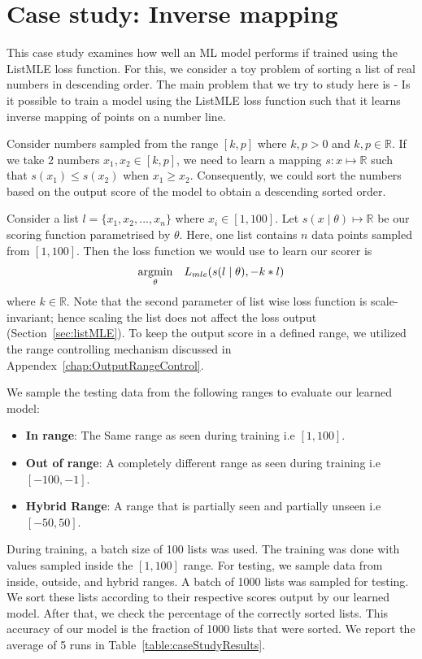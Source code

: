 \documentclass[12pt, twoside, ngerman]{report}
\begin{document}
\chapter{Case study: Inverse mapping}
\label{chap:caseStudy}

This case study examines how well an ML model performs if trained using the ListMLE loss function. For this, we consider a toy problem of sorting a list of real numbers in descending order. The main problem that we try to study here is - Is it possible to train a model using the ListMLE loss function such that it learns inverse mapping of points on a number line.

Consider numbers sampled from the range $[k,  p]$ where $k,p > 0$ and  $k,p \in \mathbb{R}$.
If we take 2 numbers $x_1, x_2 \in [k,  p]$,  we need to learn a mapping $s: x \mapsto \mathbb{R}$ such that $s(x_1) \leq s(x_2)$ when $x_1 \geq x_2$.
Consequently, we could sort the numbers based on the output score of the model to obtain a descending sorted order.

Consider a list $l = \{x_1, x_2, ..., x_n\}$ where $x_i \in [1, 100]$.
Let $s(x \mid \theta) \mapsto \mathbb{R}$ be our scoring function parametrised by $\theta$.
Here, one list contains $n$ data points sampled from $[1, 100]$.
Then the loss function we would use to learn our scorer is
\begin{equation}
\underset{\theta}{\rm argmin} \quad L_{mle}(s(l \mid \theta),  - k * l)
\end{equation}
where $k \in \mathbb{R}$.
Note that the second parameter of list wise loss function is scale-invariant; hence scaling the list does not affect the loss output (Section~\ref{sec:listMLE}).
To keep the output score in a defined range, we utilized the range controlling mechanism discussed in Appendex~\ref{chap:OutputRangeControl}.

We sample the testing data from the following ranges to evaluate our learned model:
\begin{itemize}
\item \textbf{In range}: The Same range as seen during training i.e $[1, 100]$.
\item \textbf{Out of range}: A completely different range as seen during training i.e $[-100, -1]$.
\item \textbf{Hybrid Range}: A range that is partially seen and partially unseen i.e $[-50, 50]$.
\end{itemize} 
 
During training, a batch size of 100 lists was used. The training was done with values sampled inside the $[1, 100]$ range.
For testing, we sample data from inside, outside, and hybrid ranges.
A batch of 1000 lists was sampled for testing.
We sort these lists according to their respective scores output by our learned model.
After that, we check the percentage of the correctly sorted lists.
This accuracy of our model is the fraction of 1000 lists that were sorted.
We report the average of 5 runs in Table~\ref{table:caseStudyResults}.
\end{document}
